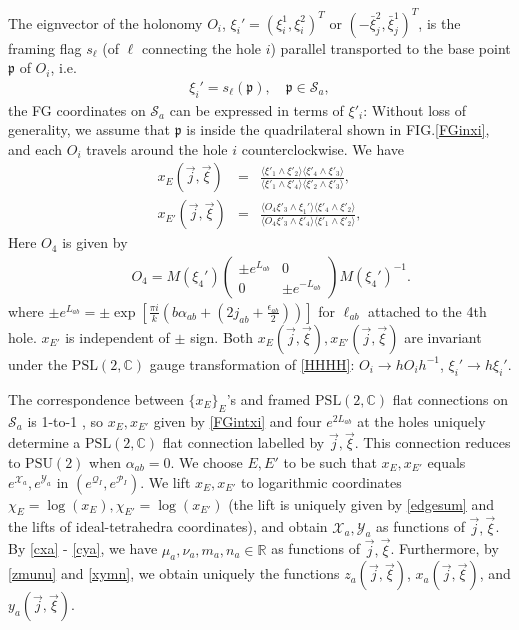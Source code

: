 \documentclass[aps,prd,notitlepage,nofootinbib,superscriptaddress,groupedaddress,twocolumn]{revtex4-1}
\def\R{\mathbb{R}}
\newcommand{\PSlc}{\mathrm{PSL}(2,\mathbb{C})}
\newcommand{\PSu}{\mathrm{PSU}(2)}
\def\be{\begin{eqnarray}}
\def\ee{\end{eqnarray}}
\newcommand{\cs}{\mathcal S}
\newcommand{\cx}{\mathcal X}
\newcommand{\cy}{\mathcal Y}
\newcommand{\scrp}{\mathscr{P}}
\newcommand{\scrq}{\mathscr{Q}}
\newcommand{\fp}{\mathfrak{p}}  \newcommand{\Fp}{\mathfrak{P}}
\renewcommand{\a}{\alpha}
\begin{document}
The eignvector of the holonomy $O_i$, $\xi_i'=(\xi_i^1,\xi_i^2)^T$ or $(-\bar{\xi}_j^2,\bar{\xi}_j^1)^T$, is the framing flag $s_\ell$ (of $\ell$ connecting the hole $i$) parallel transported to the base point $\fp$ of $O_i$, i.e.
\be
\xi_{i}'=s_\ell(\fp),\quad \fp\in\cs_a,\label{xiframing}
\ee
the FG coordinates on $\cs_a$ can be expressed in terms of $\xi'_i$: Without loss of generality, we assume that $\fp$ is inside the quadrilateral shown in FIG.\ref{FGinxi}, and each $O_i$ travels around the hole $i$ counterclockwise. We have 
\be
x_E(\vec{j},\vec{\xi})&=&\frac{\langle \xi'_1\wedge\xi'_2\rangle\langle\xi'_{4}\wedge\xi'_3\rangle}{\langle \xi'_1\wedge\xi'_{4}\rangle\langle\xi'_{2}\wedge\xi'_3\rangle},\nonumber\\
x_{E'}(\vec{j},\vec{\xi})&=&\frac{\langle O_4\xi'_3\wedge\xi_1'\rangle\langle\xi'_{4}\wedge\xi'_2\rangle}{\langle O_4\xi'_3\wedge\xi'_{4}\rangle\langle\xi'_{1}\wedge\xi'_2\rangle},\label{FGintxi}
\ee
Here $O_4$ is given by 
\be
&&O_4= M(\xi_4')\left(\begin{array}{cc}
	  \pm e^{L_{ab}} & 0 \\
	0 & \pm e^{-L_{ab}}
	\end{array}\right)M(\xi_4')^{-1}.
\ee
where $\pm e^{L_{ab}}=\pm\exp \left[\frac{ \pi i}{k}\left(b \alpha_{a b}+\left(2 j_{a b}+\frac{\epsilon_{a b}}{2}\right)\right)\right]$ for $\ell_{ab}$ attached to the 4th hole. %
$x_{E'}$ is independent of $\pm$ sign. Both $x_E(\vec{j},\vec{\xi}),x_{E'}(\vec{j},\vec{\xi})$ are invariant under the $\PSlc$ gauge transformation of \eqref{HHHH}: $O_i\to hO_i h^{-1}$, $\xi_i'\to h\xi_i'$.  

The correspondence between $\{x_E\}_E$'s and framed $\PSlc$ flat connections on $\cs_a$ is 1-to-1 \cite{FG03}, so $x_E,x_{E'}$ given by \eqref{FGintxi} and four $e^{2L_{ab}}$ at the holes uniquely determine a $\PSlc$ flat connection labelled by $\vec{j},\vec{\xi}$. This connection reduces to $\PSu$ when $\a_{ab}=0$. We choose $E,E'$ to be such that $x_{E},x_{E'}$ equals $e^{\cx_a},e^{\cy_a}$ in $(e^{\scrq_I},e^{\scrp_I})$. We lift $x_E,x_{E'}$ to logarithmic coordinates $\chi_E=\log(x_E),\chi_{E'}=\log(x_{E'})$ (the lift is uniquely given by \eqref{edgesum} and the lifts of ideal-tetrahedra coordinates), and obtain $\cx_a,\cy_a$ as functions of $\vec{j},\vec{\xi}$. By \eqref{cxa} - \eqref{cya}, we have $\mu_a,\nu_a,m_a,n_a\in\R$ as functions of $\vec{j},\vec{\xi}$. Furthermore, by \eqref{zmunu} and \eqref{xymn}, we obtain uniquely the functions $z_a(\vec{j},\vec{\xi})$, $ x_a(\vec{j},\vec{\xi})$, and $ y_a(\vec{j},\vec{\xi})$.
\end{document}
